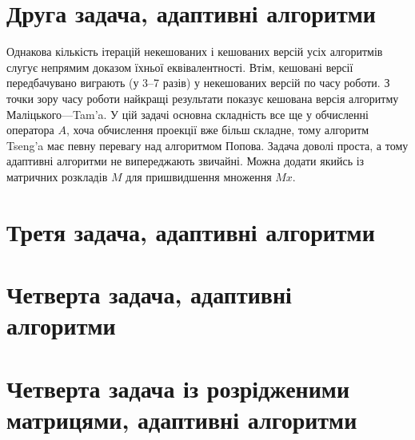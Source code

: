 \section{Друга задача, адаптивні алгоритми}



Однакова кількість ітерацій некешованих і кешованих версій усіх алгоритмів слугує непрямим доказом їхньої еквівалентності. Втім, кешовані версії передбачувано виграють (у 3--7 разів) у некешованих версій по часу роботи. З точки зору часу роботи найкращі результати показує кешована версія алгоритму Маліцького---Tam'a. У цій задачі основна складність все ще у обчисленні оператора $A$, %
хоча обчислення проекції вже більш складне, %
тому алгоритм Tseng'a має певну перевагу над алгоритмом Попова. Задача доволі проста, а тому адаптивні алгоритми не випереджають звичайні. Можна додати якийсь із матричних розкладів $M$ для пришвидшення множення $M x$.

\section{Третя задача, адаптивні алгоритми}



\section{Четверта задача, адаптивні алгоритми}



\section{Четверта задача із розрідженими матрицями, адаптивні алгоритми}


